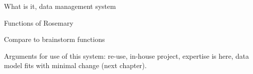 What is it, data management system

Functions of Rosemary

Compare to brainstorm functions

Arguments for use of this system: re-use, in-house project, expertise is here, data model fits with minimal change (next chapter).
